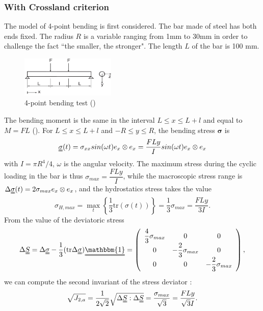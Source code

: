 \subsubsection{With Crossland criterion}
The model of 4-point bending is first considered. The bar made of steel has both ends fixed. The radius $R$ is a variable ranging from 1mm to 30mm in order to  challenge the fact ``the smaller, the stronger". The length $L$ of the bar is 100 mm.

\begin{figure}[h!]
	\centering
	\includegraphics[width=0.4\textwidth]{figures//fig11.jpg} 
	\caption{4-point bending test (\cite{Papadopoulos1996513}) }
	\label{fig11}
\end{figure}

The bending moment is the same in the interval $L\leqslant x \leqslant L+l$ and equal to
$M = FL$ ().
For $L\leqslant x \leqslant L+l$ and  $-R\leqslant y \leqslant R$, the bending stress $\bm{\sigma}$  is
\begin{equation}
	\uuline{\sigma}(t)=\sigma_{xx}sin(\omega t)e_x\otimes e_x=\dfrac{FLy}{I}sin(\omega t) e_x\otimes e_x \label{bending4} \end{equation}
with $I=\pi R^4/4$, $\omega$ is the angular velocity.  The maximum stress during the cyclic loading in the bar  is thus 
$ \sigma_{max}=\dfrac{FLy}{I}$, 
while the macroscopic stress range is $ \Delta\uuline{\sigma}(t)=2\sigma_{max}e_x\otimes e_x $, and the 
hydrostatics stress takes the value
\begin{equation}
	\sigma_{H,max}=\max\limits_{t}\left\lbrace \dfrac{1}{3}\textrm{tr}(\sigma(t))\right\rbrace =\dfrac{1}{3}\sigma_{max}=\dfrac{FLy}{3I}.
\end{equation}
From the value of  the deviatoric stress
\begin{equation} 
	\Delta\uuline{ S}=\Delta\uuline{\sigma}-\dfrac{1}{3}(\textrm{tr}\Delta\uuline{\sigma})\uuline{\mathbbm{1}}=
	\left(
	\begin{array}{ccc}
		\dfrac{4}{3}\sigma_{max} & 0 & 0\\
		0 & -\dfrac{2}{3}\sigma_{max} & 0\\ 
		0 & 0 & -\dfrac{2}{3}\sigma_{max}\\
	\end{array}\right) ,
\end{equation}
we can compute the second invariant of the stress deviator :
\begin{equation}
	\sqrt{J_{2,a}}=\dfrac{1}{2\sqrt{2}}\sqrt{\Delta \uuline{S}:\Delta \uuline{S}}=\dfrac{\sigma_{max}}{\sqrt{3}} =\dfrac{FLy}{\sqrt{3}I} .
\end{equation}



